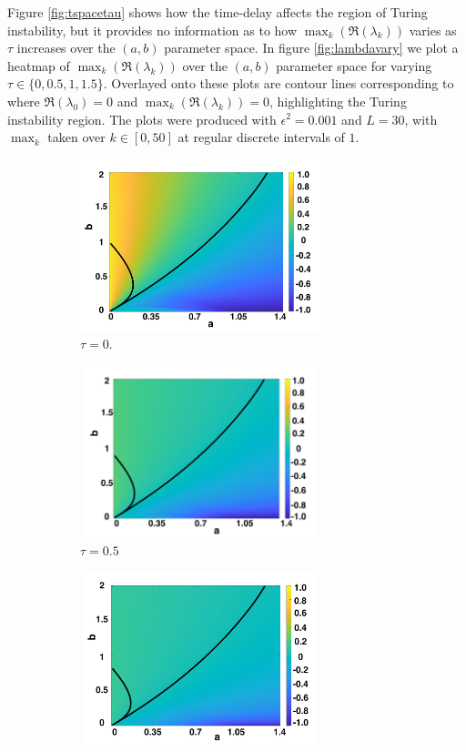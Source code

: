 Figure \ref{fig:tspacetau} shows how the time-delay affects the region of Turing instability, but it provides no information as to how $\max_k(\Re(\lambda_k))$ varies as $\tau$ increases over the $(a,b)$ parameter space. In figure \ref{fig:lambdavary} we plot a heatmap of $\max_k(\Re(\lambda_k))$ over the $(a,b)$ parameter space for varying $\tau\in\{0,0.5,1,1.5\}$. Overlayed onto these plots are contour lines corresponding to where $\Re(\lambda_0)=0$ and $\max_k(\Re(\lambda_k))=0$, highlighting the Turing instability region. The plots were produced with $\epsilon^2=0.001$ and $L=30$, with $\max_k$ taken over $k\in[0,50]$ at regular discrete intervals of $1$.
\begin{figure}[H]
    \centering
    \begin{subfigure}[b]{0.45\textwidth}
        \centering
        \includegraphics[width=7cm,height=5cm]{tau0bif.png}
        \caption{$\tau=0$.}
        \label{}
    \end{subfigure}
    \hfill
    \begin{subfigure}[b]{0.45\textwidth}
        \centering
        \includegraphics[width=7cm,height=5cm]{tau05bif.png}
        \caption{$\tau=0.5$}
        \label{}
    \end{subfigure}
    \hfill
    \begin{subfigure}[b]{0.45\textwidth}
        \centering
        \includegraphics[width=7cm,height=5cm]{tau1bif.png}

\end{subfigure}
\end{figure}
